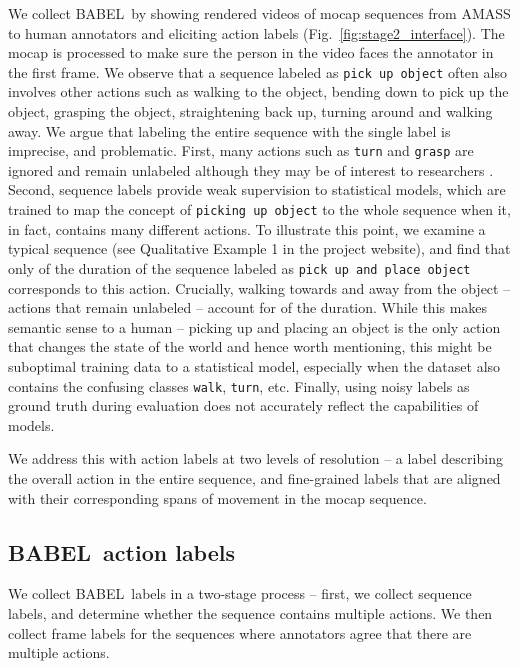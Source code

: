 \documentclass[final]{cvpr}
\def\babel{BABEL}
\begin{document}
We collect \babel~by showing rendered videos of mocap sequences from AMASS \cite{DBLP:conf/iccv/MahmoodGTPB19} to human annotators and eliciting action labels (Fig.~\ref{fig:stage2_interface}). 
The mocap is processed to make sure the person in the video faces the annotator in the first frame. We observe that a sequence labeled as \texttt{pick up object} often also involves other actions such as walking to the object, bending down to pick up the object, grasping the object, straightening back up, turning around and walking away. 
We argue that labeling the entire sequence with the single label is imprecise, and problematic. 
First, many actions such as \texttt{turn} and \texttt{grasp} are ignored and remain unlabeled although they may be of interest to researchers \cite{DBLP:conf/eccv/TaheriGBT20}. 
Second, sequence labels provide weak supervision to statistical models, which are trained to map the concept of \texttt{picking up object} to the whole sequence when it, in fact, contains many different actions. 
To illustrate this point, we examine a typical sequence (see Qualitative Example 1 in the project website), and find that only  of the duration of the sequence labeled as \texttt{pick up and place object} corresponds to this action. Crucially, walking towards and away from the object -- actions that remain unlabeled -- account for  of the duration. 
While this makes semantic sense to a human -- picking up and placing an object is the only action that changes the state of the world and hence worth mentioning, this might be suboptimal training data to a statistical model, especially when the dataset also contains the confusing classes \texttt{walk}, \texttt{turn}, etc. 
Finally, using noisy labels as ground truth during evaluation does not accurately reflect the capabilities of models. 

We address this with action labels at two levels of resolution -- a label describing the overall action in the entire sequence, and fine-grained labels that are aligned with their corresponding spans of movement in the mocap sequence.

\subsection{\babel~action labels}

We collect \babel~labels in a two-stage process -- first, we collect sequence labels, and determine whether the sequence contains multiple actions. 
We then collect frame labels for the sequences where  annotators agree that there are multiple actions. 
\end{document}
